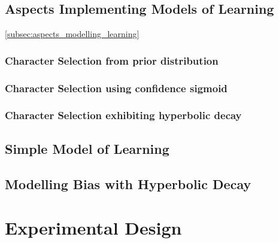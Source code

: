 \subsection{Aspects Implementing Models of Learning}\cref{subsec:aspects_modelling_learning}

\subsubsection{Character Selection from prior distribution}

\subsubsection{Character Selection using confidence sigmoid}\label{subsubsec:learning_by_picking_from_distribution_of_wins_with_confidence}

\subsubsection{Character Selection exhibiting hyperbolic decay}\label{subsubsec:learning_with_hyperbolic_decay}




\subsection{Simple Model of Learning}\label{subsec:optimisation_with_aspects_basiclearningaspect}





\subsection{Modelling Bias with Hyperbolic Decay}\label{subsec:optimisation_with_aspects_hyperbolicdecay}




\section{Experimental Design}\label{sec:optimisation_with_aspects_experimental_design}

